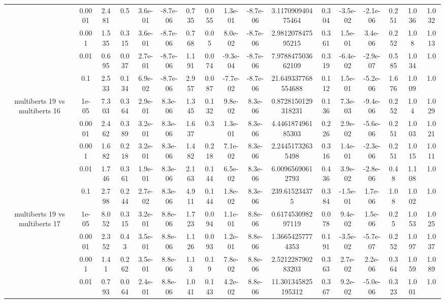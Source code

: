 \begin{tabular}{|c|c|c|c|c|c|c|c|c|c|c|c|c|c|c|c|c|}
 & 0.0001 & 2.481 & 0.5 & 3.6e-01 & -8.7e-06 & 0.735 & 0.055 & 1.3e-01 & -8.7e-06 & 3.117090940475464 & 0.304 & -3.5e-02 & -2.1e-06 & 0.251 & 1.036 & 1.032 \\
 & 0.001 & 1.535 & 0.315 & 3.6e-01 & -8.7e-06 & 0.768 & 0.05 & 8.0e-02 & -8.7e-06 & 2.981207847595215 & 0.361 & 1.5e-01 & 3.4e-06 & 0.252 & 1.08 & 1.013 \\
 & 0.01 & 0.695 & 0.037 & 2.7e-01 & -8.7e-06 & 1.191 & 0.074 & -9.3e-04 & -8.7e-06 & 7.978847503662109 & 0.319 & -6.4e-02 & -2.9e-07 & 0.585 & 1.034 & 1.0 \\
 & 0.1 & 2.533 & 0.134 & 6.9e-02 & -8.7e-06 & 2.957 & 0.087 & -7.7e-02 & -8.7e-06 & 21.649337768554688 & 0.112 & 1.5e-01 & -5.2e-06 & 1.676 & 1.009 & 1.0 \\
\hline
\multirow{5}{*}{multiberts 19 vs multiberts 16} & 1e-05 & 7.303 & 0.364 & 2.9e-01 & 8.3e-06 & 1.345 & 0.132 & 9.8e-02 & 8.3e-06 & 0.8728150129318231 & 0.136 & 7.3e-03 & -9.4e-06 & 0.252 & 1.04 & 1.029 \\
 & 0.0001 & 2.462 & 0.389 & 3.2e-01 & 8.3e-06 & 1.637 & 0.3 & 1.3e-01 & 8.3e-06 & 4.446187496185303 & 0.226 & 2.9e-02 & -5.6e-06 & 0.251 & 1.003 & 1.021 \\
 & 0.001 & 1.682 & 0.218 & 3.2e-01 & 8.3e-06 & 1.482 & 0.218 & 7.1e-02 & 8.3e-06 & 2.24451732635498 & 0.316 & 1.4e-01 & -2.3e-06 & 0.251 & 1.015 & 1.011 \\
 & 0.01 & 1.746 & 0.361 & 1.9e-01 & 8.3e-06 & 2.163 & 0.144 & 6.5e-02 & 8.3e-06 & 6.00965690612793 & 0.436 & 3.9e-02 & -2.8e-06 & 0.48 & 1.108 & 1.0 \\
 & 0.1 & 2.798 & 0.244 & 2.7e-02 & 8.3e-06 & 4.911 & 0.144 & 1.8e-02 & 8.3e-06 & 239.615234375 & 0.384 & -1.5e-01 & 1.7e-06 & 1.08 & 1.002 & 1.0 \\
\hline
\multirow{5}{*}{multiberts 19 vs multiberts 17} & 1e-05 & 8.052 & 0.315 & 3.2e-01 & 8.8e-06 & 1.723 & 0.094 & 1.1e-01 & 8.8e-06 & 0.617453098297119 & 0.078 & 9.4e-02 & 1.5e-06 & 0.25 & 1.053 & 1.025 \\
 & 0.0001 & 2.352 & 0.43 & 3.5e-01 & 8.8e-06 & 1.126 & 0.093 & 1.2e-01 & 8.8e-06 & 1.36654257774353 & 0.191 & -3.5e-02 & -5.7e-07 & 0.252 & 1.097 & 1.037 \\
 & 0.001 & 1.41 & 0.262 & 3.5e-01 & 8.8e-06 & 1.13 & 0.19 & 7.8e-02 & 8.8e-06 & 2.521228790283203 & 0.363 & 2.7e-02 & 2.2e-06 & 0.364 & 1.059 & 1.089 \\
 & 0.01 & 0.793 & 0.064 & 2.4e-01 & 8.8e-06 & 1.041 & 0.143 & 4.2e-02 & 8.8e-06 & 11.301345825195312 & 0.367 & 9.2e-02 & -5.0e-06 & 0.323 & 1.001 & 1.0 \\

\end{tabular}
